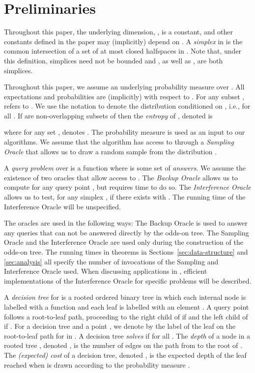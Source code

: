 \documentclass{patmorin}
\begin{document}
\section{Preliminaries}

Throughout this paper, the underlying dimension, , is a constant, and
other constants defined in the paper may (implicitly) depend on .
A \emph{simplex} in  is the common intersection of a set of at most
 closed halfspaces in . Note that, under this definition,
simplices need not be bounded and , as well as , are
both simplices.


Throughout this paper, we assume an underlying probability measure
 over .  All expectations and probabilities are (implicitly)
with respect to .  For any subset ,  refers
to .  We use the notation  to denote the distribution 
conditioned on , i.e., 
for all .  If  are non-overlapping
subsets of  then the \emph{entropy} of , denoted  is

where for any set ,  denotes .
The probability measure  is used as an input to our algorithms.
We assume that the algorithm has access to  through a \emph{Sampling
Oracle} that allows us to draw a random sample  from the
distribution .

A \emph{query problem} over  is a function
 where  is some set of \emph{answers}.
We assume the existence of two oracles that allow access to .
The \emph{Backup Oracle} allows us to compute  for
any query point , but requires  time to do so.  The
\emph{Interference Oracle} allows us to test, for any simplex ,
if there exists  with .
The running time of the Interference Oracle will be unspecified.

The oracles are used in the following ways:  The Backup Oracle is used to
answer any queries that can not be answered directly by the odds-on tree.
The Sampling Oracle and the Interference Oracle are used only during
the construction of the odds-on tree. The running times in theorems in
Sections~\ref{sec:data-structure} and \ref{sec:analysis} all specify
the number of invocations of the Sampling and Interference Oracle
used. When discussing applications in , efficient
implementations of the Interference Oracle for specific problems will
be described.

A \emph{decision tree} for  is a rooted ordered binary
tree in which each internal node  is labelled with a function
 and each leaf  is labelled with an element
.  A query point  follows a root-to-leaf path,
proceeding to the right child of  if  and the left
child of  if .  For a decision tree  and a point
, we denote by  the label of the leaf on the root-to-leaf
path for  in .  A decision tree \emph{solves}  if
 for all . The \emph{depth} of a node 
in a rooted tree , denoted , is the number of edges
on the path from  to the root of .  The \emph{(expected) cost}
of a decision tree, denoted , is the expected depth of the
leaf reached when  is drawn according to the probability measure .
\end{document}
